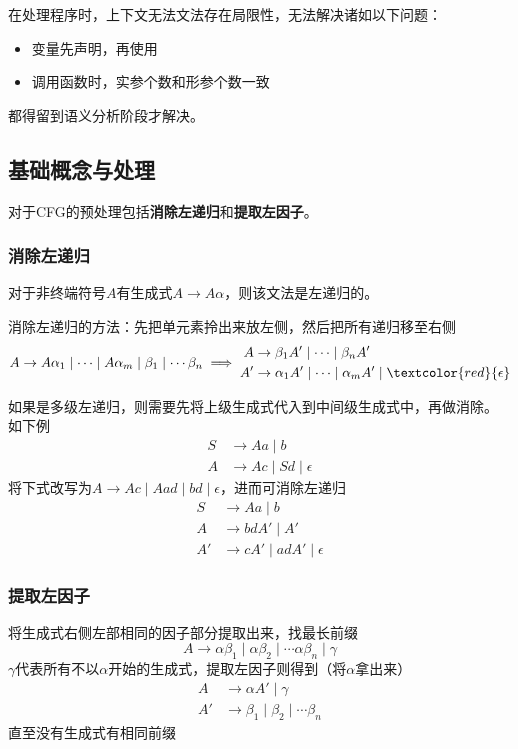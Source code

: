 在处理程序时，上下文无法文法存在局限性，无法解决诸如以下问题：
\begin{itemize}
\item 变量先声明，再使用
\item 调用函数时，实参个数和形参个数一致
\end{itemize}
都得留到语义分析阶段才解决。

\subsection{基础概念与处理}
对于CFG的预处理包括\textbf{消除左递归}和\textbf{提取左因子}。

\subsubsection{消除左递归}
\begin{definition}[左递归]
对于非终端符号$A$有生成式$A\to A\alpha$，则该文法是左递归的。
\end{definition}

消除左递归的方法：先把单元素拎出来放左侧，然后把所有递归移至右侧
\[A\to A\alpha_1\mid \cdots\mid A\alpha_m\mid\beta_1\mid\cdots\beta_n
\implies
\begin{aligned}
A &\to\beta_1 A'\mid\cdots\mid\beta_n A'\\
A' &\to\alpha_1 A'\mid\cdots\mid\alpha_m A'\mid\textcolor{red}{\epsilon}
\end{aligned}\]

\begin{example}
如果是多级左递归，则需要先将上级生成式代入到中间级生成式中，再做消除。
如下例
\[\begin{aligned}
S &\to Aa\mid b\\
A &\to Ac\mid Sd\mid \epsilon
\end{aligned}\]
将下式改写为$A \to Ac\mid Aad\mid bd\mid \epsilon$，进而可消除左递归
\[\begin{aligned}
S &\to Aa\mid b\\
A &\to bdA'\mid A'\\
A' &\to cA'\mid adA'\mid \epsilon
\end{aligned}\]
\end{example}

\subsubsection{提取左因子}
\begin{definition}
将生成式右侧左部相同的因子部分提取出来，找最长前缀
\[A\to\alpha\beta_1\mid\alpha\beta_2\mid\cdots\alpha\beta_n\mid\gamma\]
$\gamma$代表所有不以$\alpha$开始的生成式，提取左因子则得到（将$\alpha$拿出来）
\[\begin{aligned}
A &\to \alpha A'\mid\gamma\\
A' &\to \beta_1\mid\beta_2\mid\cdots\beta_n
\end{aligned}\]
直至没有生成式有相同前缀
\end{definition}


